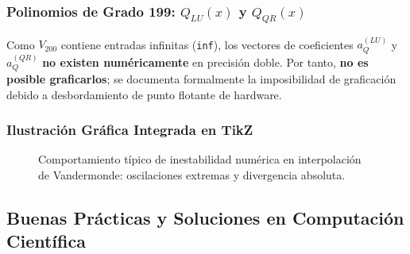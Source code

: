 \documentclass[11pt,a4paper]{article}
\theoremstyle{definition}
\theoremstyle{remark}
\begin{document}
\subsubsection{Polinomios de Grado 199: $Q_{LU}(x)$ y $Q_{QR}(x)$}
Como $V_{200}$ contiene entradas infinitas (\texttt{inf}), los vectores de coeficientes $a_Q^{(LU)}$ y $a_Q^{(QR)}$ \textbf{no existen numéricamente} en precisión doble. Por tanto, \textbf{no es posible graficarlos}; se documenta formalmente la imposibilidad de graficación debido a desbordamiento de punto flotante de hardware.

\subsubsection{Ilustración Gráfica Integrada en TikZ}

\begin{figure}[h!]
    \centering
    \caption{Comportamiento típico de inestabilidad numérica en interpolación de Vandermonde: oscilaciones extremas y divergencia absoluta.}
    \label{fig:grafica_p19_doc}
\end{figure}

\subsection{Buenas Prácticas y Soluciones en Computación Científica}
\end{document}

